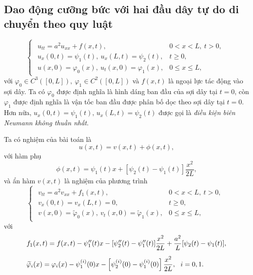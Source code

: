 \documentclass[10pt, a4paper]{article}
\begin{document}
	\subsection{Dao động cưỡng bức với hai đầu dây tự do di chuyển theo quy luật}
	\vspace{2mm}
	\begin{tcolorbox}[enhanced,colback=blue!5!white,colframe=blue!75!black,sharp corners=all,shadow={0mm}{0mm}{-1.5mm}%
		{fill=blue!75!red,opacity=0.3},title=\textbf{Dạng của bài toán}]
		$$\begin{cases}
			\begin{array}{ll}
				u_{tt}=a^2u_{xx}+f(x,t), & 0<x<L,~t>0,\\
				u_x(0,t)=\psi_1(t),~u_x(L,t)=\psi_2(t), & t\ge0,\\
				u(x,0)=\varphi_0(x),~u_t(x,0)=\varphi_1(x), & 0\le x\le L,
			\end{array}
		\end{cases}$$
		với $\varphi_0\in C^3([0,L]),~\varphi_1\in C^2([0,L])$ và $f(x,t)$ là ngoại lực tác động vào sợi dây.\vskip7pt
		\quad Ta có $\varphi_0$ được định nghĩa là hình dáng ban đầu của sợi dây tại $t=0$, còn $\varphi_1$ được định nghĩa là vận tốc ban đầu được phân bố dọc theo sợi dây tại $t=0$.\vskip7pt
		\quad Hơn nữa, $u_x(0,t)=\psi_1(t),\,u_x(L,t)=\psi_2(t)$ được gọi là \textit{điều kiện biên Neumann không thuần nhất}.
	\end{tcolorbox}
	\vspace{2mm}
	Ta có nghiệm của bài toán là $$u(x,t)=v(x,t)+\phi(x,t),$$ với hàm phụ $$\phi(x,t)=\psi_1(t)x+[\psi_2(t)-\psi_1(t)]\dfrac{x^2}{2L},$$
	và ẩn hàm $v(x,t)$ là nghiệm của phương trình $$\begin{cases}
		\begin{array}{ll}
			v_{tt}=a^2v_{xx}+f_1(x,t), & 0<x<L,~t>0,\\
			v_x(0,t)=v_x(L,t)=0, & t\ge0,\\
			v(x,0)=\widetilde\varphi_0(x),~v_t(x,0)=\widetilde\varphi_1(x), & 0\le x\le L,
		\end{array}
	\end{cases}$$ với \begin{align*}
		&f_1(x,t)=f(x,t)-\psi_1''(t)x-[\psi_2''(t)-\psi_1''(t)]\dfrac{x^2}{2L}+\dfrac{a^2}{L}[\psi_2(t)-\psi_1(t)],\\
		\noalign{\vskip5pt}
		&\widetilde\varphi_i(x)=\varphi_i(x)-\psi_1^{(i)}(0)x-\left[\psi_2^{(i)}(0)-\psi_1^{(i)}(0)\right]\dfrac{x^2}{2L},~~i=0,1.
	\end{align*}
	
\end{document}
